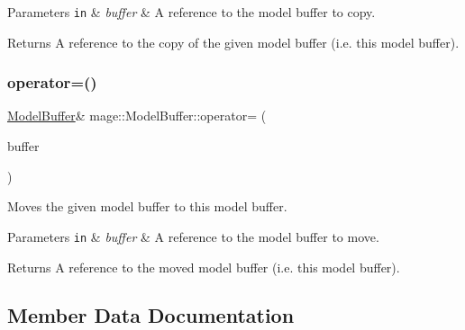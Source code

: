 \begin{DoxyParams}[1]{Parameters}
\mbox{\tt in}  & {\em buffer} & A reference to the model buffer to copy. \\
\hline
\end{DoxyParams}
\begin{DoxyReturn}{Returns}
A reference to the copy of the given model buffer (i.\+e. this model buffer). 
\end{DoxyReturn}
\hypertarget{structmage_1_1_model_buffer_a2f2c8c5ec6a43c239f349e3c015320e0}{}\label{structmage_1_1_model_buffer_a2f2c8c5ec6a43c239f349e3c015320e0} 
\subsubsection{\texorpdfstring{operator=()}{operator=()}\hspace{0.1cm}{\footnotesize\ttfamily [2/2]}}
{\footnotesize\ttfamily \hyperlink{structmage_1_1_model_buffer}{Model\+Buffer}\& mage\+::\+Model\+Buffer\+::operator= (\begin{DoxyParamCaption}\item[{\hyperlink{structmage_1_1_model_buffer}{Model\+Buffer} \&\&}]{buffer }\end{DoxyParamCaption})\hspace{0.3cm}{\ttfamily [default]}}

Moves the given model buffer to this model buffer.


\begin{DoxyParams}[1]{Parameters}
\mbox{\tt in}  & {\em buffer} & A reference to the model buffer to move. \\
\hline
\end{DoxyParams}
\begin{DoxyReturn}{Returns}
A reference to the moved model buffer (i.\+e. this model buffer). 
\end{DoxyReturn}


\subsection{Member Data Documentation}
\hypertarget{structmage_1_1_model_buffer_ad7cb4d795043cb92dad61e3aa0c4b2a2}{}\label{structmage_1_1_model_buffer_ad7cb4d795043cb92dad61e3aa0c4b2a2} 
